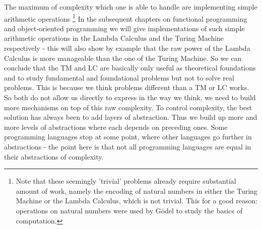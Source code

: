 The maximum of complexity which one is able to handle are implementing simple arithmetic operations \footnote{Note that these seemingly 'trivial' problems already require substantial amount of work, namely the encoding of natural numbers in either the Turing Machine or the Lambda Calculus, which is not trivial. This for a good reason: operations on natural numbers were used by Gödel to study the basics of computation.} In the subsequent chapters on functional programming and object-oriented programming we will give implementations of such simple arithmetic operations in the Lambda Calculus and the Turing Machine respectively - this will also show by example that the raw power of the Lambda Calculus is more manageable than the one of the Turing Machine.
So we can conclude that the TM and LC are basically only useful as theoretical foundations and to study fundamental and foundational problems but not to solve real problems. This is because we think problems different than a TM or LC works. So both do not allow us directly to express in the way we think, we need to build  more mechanisms on top of this raw complexity. To control complexity, the best solution has always been to add layers of abstraction. Thus we build up more and more levels of abstractions where each depends on preceding ones. Some programming languages stop at some point, where other languages go further in abstractions - the point here is that not all programming languages are equal in their abstractions of complexity.


